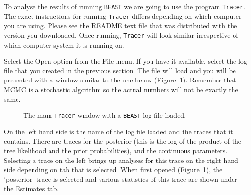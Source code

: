 \documentclass[cup7b, english]{cupbook}
\begin{document}
To analyse the results of running \texttt{BEAST} we are going to use the program \texttt{Tracer}.
The exact instructions for running \texttt{Tracer} differs depending
on which computer you are using. Please see the README text file that was distributed with the
version you downloaded. Once running, \texttt{Tracer} will look similar irrespective of which computer system
it is running on.

Select the Open option from the File menu. If you have it available, select the log file
that you created in the previous section. The file will load and you will be
presented with a window similar to the one below (Figure~\ref{fig:figure5}). Remember that MCMC is a stochastic
algorithm so the actual numbers will not be exactly the same.

\begin{figure}[htbp]
\begin{center}
\leavevmode
{}
\end{center}
\caption{The main \texttt{Tracer} window with a \texttt{BEAST} log file loaded.}
\label{fig:figure5}
\end{figure}

On the left hand side is the name of the log file loaded and the traces that it contains.
There are traces for the posterior (this is the log of the product of the tree likelihood and
the prior probabilities), and the continuous parameters. Selecting a trace on the left
brings up analyses for this trace on the right hand side depending on tab that is
selected. When first opened (Figure~\ref{fig:figure5}), the `posterior' trace is selected and various statistics
of this trace are shown under the Estimates tab.
\end{document}
